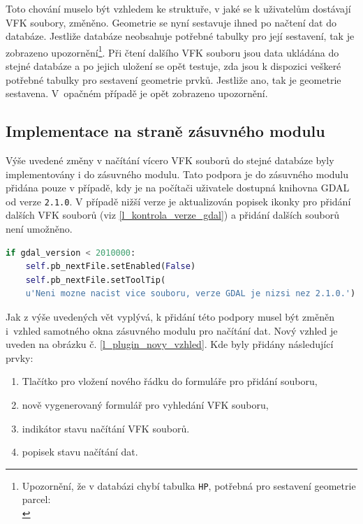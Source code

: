 \documentclass[a4paper,12pt,oneside]{book}
\begin{document}
Toto chování muselo být vzhledem ke struktuře, v jaké se k uživatelům dostávají VFK soubory, změněno. Geometrie se nyní sestavuje ihned po načtení dat do databáze. Jestliže databáze neobsahuje potřebné tabulky pro její sestavení, tak je zobrazeno upozornění\footnote{Upozornění, že v databázi chybí tabulka \texttt{HP}, potřebná pro sestavení geometrie parcel:\\}. Při čtení dalšího VFK souboru jsou data ukládána do stejné databáze a po jejich uložení se opět testuje, zda jsou k dispozici veškeré potřebné tabulky pro sestavení geometrie prvků. Jestliže ano, tak je geometrie sestavena. V~opačném případě je opět zobrazeno upozornění. 

\subsection{Implementace na straně zásuvného modulu}
Výše uvedené změny v načítání vícero VFK souborů do stejné databáze byly implementovány i do zásuvného modulu. Tato podpora je do zásuvného modulu přidána pouze v případě, kdy je na počítači uživatele dostupná knihovna GDAL od verze \texttt{2.1.0}. V případě nižší verze je aktualizován popisek ikonky pro přidání dalších VFK souborů (viz \ref{l_kontrola_verze_gdal}) a přidání dalších souborů není umožněno.

\begin{lstlisting}[language=Python, 
		    caption={Kontrola verze GDAL na straně VFK pluginu}, 
		    keywordstyle=\color{blue}\ttfamily,
		    stringstyle=\color{red}\ttfamily,
		    commentstyle=\color{green}\ttfamily, morekeywords={self},
		    label=l_kontrola_verze_gdal]
if gdal_version < 2010000:
    self.pb_nextFile.setEnabled(False)
    self.pb_nextFile.setToolTip(
	u'Neni mozne nacist vice souboru, verze GDAL je nizsi nez 2.1.0.')
\end{lstlisting}

Jak z výše uvedených vět vyplývá, k přidání této podpory musel být změněn i~vzhled samotného okna zásuvného modulu pro načítání dat. Nový vzhled je uveden na obrázku č. \ref{l_plugin_novy_vzhled}. Kde byly přidány následující prvky:

\begin{enumerate}
 \item Tlačítko pro vložení nového řádku do formuláře pro přidání souboru,
 \item nově vygenerovaný formulář pro vyhledání VFK souboru,
 \item indikátor stavu načítání VFK souborů.
 \item popisek stavu načítání dat.
\end{enumerate}
\end{document}
